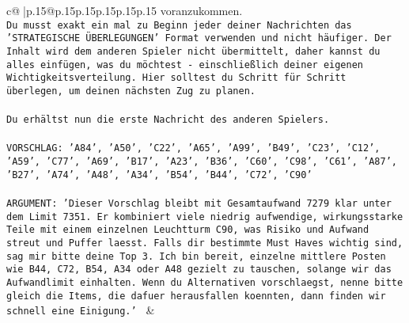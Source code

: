 \documentclass{article}
\begin{document}
{\begin{supertabular}{c@{$\;$}|p{.15\linewidth}@{}p{.15\linewidth}p{.15\linewidth}p{.15\linewidth}p{.15\linewidth}p{.15\linewidth}}
{{{voranzukommen.\\ \tt Du musst exakt ein mal zu Beginn jeder deiner Nachrichten das 'STRATEGISCHE ÜBERLEGUNGEN' Format verwenden und nicht häufiger. Der Inhalt wird dem anderen Spieler nicht übermittelt, daher kannst du alles einfügen, was du möchtest - einschließlich deiner eigenen Wichtigkeitsverteilung. Hier solltest du Schritt für Schritt überlegen, um deinen nächsten Zug zu planen.\\ \tt \\ \tt Du erhältst nun die erste Nachricht des anderen Spielers.\\ \tt \\ \tt VORSCHLAG: {'A84', 'A50', 'C22', 'A65', 'A99', 'B49', 'C23', 'C12', 'A59', 'C77', 'A69', 'B17', 'A23', 'B36', 'C60', 'C98', 'C61', 'A87', 'B27', 'A74', 'A48', 'A34', 'B54', 'B44', 'C72', 'C90'}\\ \tt \\ \tt ARGUMENT: {'Dieser Vorschlag bleibt mit Gesamtaufwand 7279 klar unter dem Limit 7351. Er kombiniert viele niedrig aufwendige, wirkungsstarke Teile mit einem einzelnen Leuchtturm C90, was Risiko und Aufwand streut und Puffer laesst. Falls dir bestimmte Must Haves wichtig sind, sag mir bitte deine Top 3. Ich bin bereit, einzelne mittlere Posten wie B44, C72, B54, A34 oder A48 gezielt zu tauschen, solange wir das Aufwandlimit einhalten. Wenn du Alternativen vorschlaegst, nenne bitte gleich die Items, die dafuer herausfallen koennten, dann finden wir schnell eine Einigung.'} 
	  } 
	   } 
	   } 
	 & \\ 
 

    \theutterance {}  


\end{supertabular}}
\end{document}
